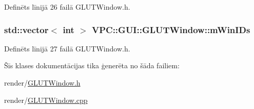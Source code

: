 Definēts līnijā 26 failā G\+L\+U\+T\+Window.\+h.

\subsubsection[{\texorpdfstring{m\+Win\+I\+Ds}{mWinIDs}}]{\setlength{\rightskip}{0pt plus 5cm}std\+::vector$<$ int $>$ V\+P\+C\+::\+G\+U\+I\+::\+G\+L\+U\+T\+Window\+::m\+Win\+I\+Ds\hspace{0.3cm}{\ttfamily [static]}}\hypertarget{class_v_p_c_1_1_g_u_i_1_1_g_l_u_t_window_a1ceb7745b98f3497579a0f4e8288419e}{}\label{class_v_p_c_1_1_g_u_i_1_1_g_l_u_t_window_a1ceb7745b98f3497579a0f4e8288419e}


Definēts līnijā 27 failā G\+L\+U\+T\+Window.\+h.



Šīs klases dokumentācijas tika ģenerēta no šāda failiem\+:\begin{DoxyCompactItemize}
\item 
render/\hyperlink{_g_l_u_t_window_8h}{G\+L\+U\+T\+Window.\+h}\item 
render/\hyperlink{_g_l_u_t_window_8cpp}{G\+L\+U\+T\+Window.\+cpp}\end{DoxyCompactItemize}
